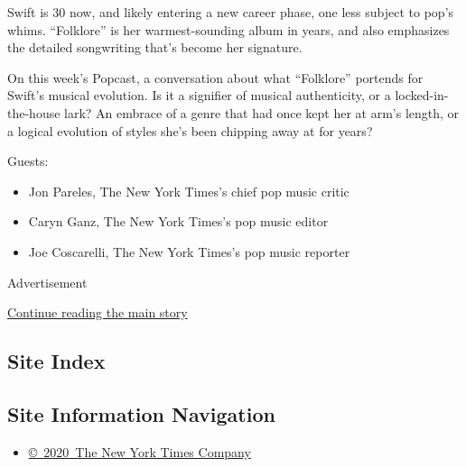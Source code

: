 Swift is 30 now, and likely entering a new career phase, one less
subject to pop's whims. ``Folklore'' is her warmest-sounding album in
years, and also emphasizes the detailed songwriting that's become her
signature.

On this week's Popcast, a conversation about what ``Folklore'' portends
for Swift's musical evolution. Is it a signifier of musical
authenticity, or a locked-in-the-house lark? An embrace of a genre that
had once kept her at arm's length, or a logical evolution of styles
she's been chipping away at for years?

Guests:

\begin{itemize}
\item
  Jon Pareles, The New York Times's chief pop music critic
\item
  Caryn Ganz, The New York Times's pop music editor
\item
  Joe Coscarelli, The New York Times's pop music reporter
\end{itemize}

Advertisement

\protect\hyperlink{after-bottom}{Continue reading the main story}

\hypertarget{site-index}{%
\subsection{Site Index}\label{site-index}}

\hypertarget{site-information-navigation}{%
\subsection{Site Information
Navigation}\label{site-information-navigation}}

\begin{itemize}
\tightlist
\item
  \href{https://help.nytimes3xbfgragh.onion/hc/en-us/articles/115014792127-Copyright-notice}{©~2020~The
  New York Times Company}
\end{itemize}

